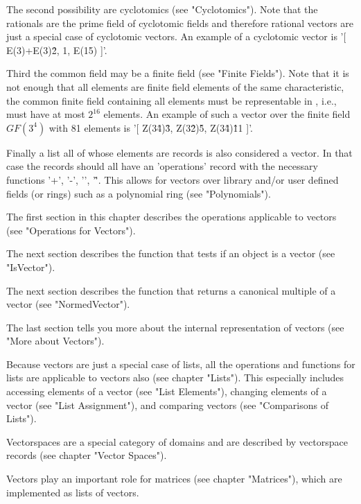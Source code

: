 The second possibility  are  cyclotomics (see "Cyclotomics").   Note that
the  rationals  are the  prime field  of  cyclotomic fields and therefore
rational  vectors are  just a  special  case of  cyclotomic vectors.   An
example of a cyclotomic vector is '[ E(3)+E(3)\^2, 1, E(15) ]'.

Third the common field may be a finite field (see "Finite Fields").  Note
that it is not enough that  all elements are finite field elements of the
same characteristic, the common finite field containing all elements must
be representable  in  {\GAP}, i.e., must have  at most $2^{16}$ elements.
An  example of such  a vector over the finite  field  $GF(3^4)$  with  81
elements is '[ Z(3\^4)\^3, Z(3\^2)\^5, Z(3\^4)\^11 ]'.

Finally  a list  all of whose elements are  records is also considered  a
vector.  In that case the records should all have  an 'operations' record
with  the necessary  functions '+', '-',  '\*',  '\^'.   This allows  for
vectors  over  library  and/or user defined fields  (or rings)  such as a
polynomial ring (see "Polynomials").

The first section in this  chapter describes the operations applicable to
vectors (see "Operations for Vectors").

The  next section describes  the function that   tests if an  object is a
vector (see "IsVector").

The next section describes the function that returns a canonical multiple
of a vector (see "NormedVector").

The  last section  tells you  more  about the internal representation  of
vectors (see "More about Vectors").

Because vectors are just a special case of lists,  all the operations and
functions for lists are applicable to vectors also (see chapter "Lists").
This especially includes   accessing elements  of   a vector (see   "List
Elements"), changing elements of  a  vector (see "List  Assignment"), and
comparing vectors (see "Comparisons of Lists").

Vectorspaces  are a special  category   of domains and  are described  by
vectorspace records (see chapter "Vector Spaces").

Vectors  play  an important role  for  matrices (see chapter "Matrices"),
which are implemented as lists of vectors.

%

